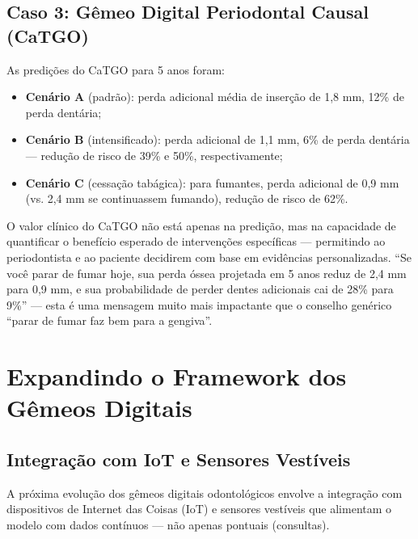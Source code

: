 \subsection{Caso 3: Gêmeo Digital Periodontal Causal (CaTGO)}


As predições do CaTGO para 5 anos foram:
\begin{itemize}
    \item \textbf{Cenário A} (padrão): perda adicional média de inserção de 1,8 mm, 12\% de perda dentária;
    \item \textbf{Cenário B} (intensificado): perda adicional de 1,1 mm, 6\% de perda dentária --- redução de risco de 39\% e 50\%, respectivamente;
    \item \textbf{Cenário C} (cessação tabágica): para fumantes, perda adicional de 0,9 mm (vs. 2,4 mm se continuassem fumando), redução de risco de 62\%.
\end{itemize}

O valor clínico do CaTGO não está apenas na predição, mas na capacidade de quantificar o benefício esperado de intervenções específicas --- permitindo ao periodontista e ao paciente decidirem com base em evidências personalizadas. ``Se você parar de fumar hoje, sua perda óssea projetada em 5 anos reduz de 2,4 mm para 0,9 mm, e sua probabilidade de perder dentes adicionais cai de 28\% para 9\%'' --- esta é uma mensagem muito mais impactante que o conselho genérico ``parar de fumar faz bem para a gengiva''.

\section{Expandindo o Framework dos Gêmeos Digitais}

\subsection{Integração com IoT e Sensores Vestíveis}

A próxima evolução dos gêmeos digitais odontológicos envolve a integração com dispositivos de Internet das Coisas (IoT) e sensores vestíveis que alimentam o modelo com dados contínuos --- não apenas pontuais (consultas).


